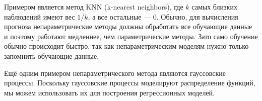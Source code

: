 \documentclass[11pt,a4paper]{article}
\begin{document}
%    
%    
%    
%    
    
    \begin{center}
    \end{center}
    
    Примером является метод KNN (k-nearest neighbors), где \(k\) самых
близких наблюдений имеют вес \(1/k\), а все остальные --- \(0\). Обычно,
для вычисления прогноза непараметрические методы должны обработать все
обучающие данные и поэтому работают медленнее, чем параметрические
методы. Зато само обучение обычно происходит быстро, так как
непараметрическим моделям нужно только запомнить обучающие данные.

Ещё одним примером непараметрического метода являются гауссовские
процессы. Поскольку гауссовские процессы моделируют распределение
функций, мы можем использовать их для построения регрессионных моделей.
\end{document}
